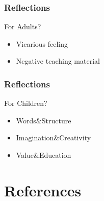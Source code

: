 \documentclass{beamer}
\begin{document}
\begin{frame}
    \frametitle{Reflections}
    \Large
    \begin{block}{For Adults?}
        \begin{itemize}
            \item Vicarious feeling
            \item Negative teaching material
        \end{itemize}
    \end{block}
\end{frame}

\begin{frame}
    \frametitle{Reflections}
    \Large
    \begin{block}{For Children?}
        \begin{itemize}[<+->]
            \item Words$\&$Structure
            \item Imagination$\&$Creativity
            \item Value$\&$Education
        \end{itemize}
    \end{block}
\end{frame}

\section{References}

\begin{frame}[allowframebreaks]
    
    
\end{frame}

\begin{frame}
    \begin{center}
        {\Huge{}}\cite[template]{origin}
    \end{center}
\end{frame}
\end{document}
